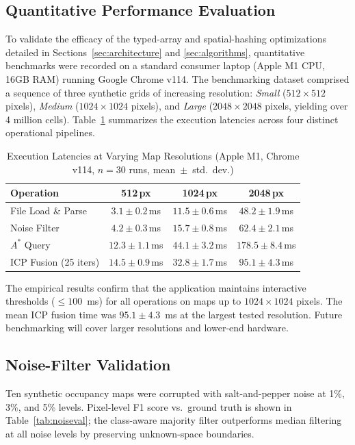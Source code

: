 \documentclass{IEEE_lsens}
\begin{document}
\subsection{Quantitative Performance Evaluation}
To validate the efficacy of the typed-array and spatial-hashing optimizations detailed in Sections~\ref{sec:architecture} and \ref{sec:algorithms}, quantitative benchmarks were recorded on a standard consumer laptop (Apple M1 CPU, 16GB RAM) running Google Chrome v114. The benchmarking dataset comprised a sequence of three synthetic grids of increasing resolution: \emph{Small} ($512 \times 512$ pixels), \emph{Medium} ($1024 \times 1024$ pixels), and \emph{Large} ($2048 \times 2048$ pixels, yielding over 4 million cells). Table~\ref{tab:benchmarks} summarizes the execution latencies across four distinct operational pipelines.

\begin{table}[t]
\centering
\caption{Execution Latencies at Varying Map Resolutions (Apple M1, Chrome v114, $n=30$ runs, mean~$\pm$~std.\ dev.)}
\label{tab:benchmarks}
\scriptsize
\renewcommand{\arraystretch}{1.1}
\begin{tabular}{@{}lccc@{}}
\toprule
\textbf{Operation} & \textbf{512\,px} & \textbf{1024\,px} & \textbf{2048\,px} \\
\midrule
File Load \& Parse & $3.1 \pm 0.2$\,ms & $11.5 \pm 0.6$\,ms & $48.2 \pm 1.9$\,ms \\
Noise Filter & $4.2 \pm 0.3$\,ms & $15.7 \pm 0.8$\,ms & $62.4 \pm 2.1$\,ms \\
$A^{*}$ Query & $12.3 \pm 1.1$\,ms & $44.1 \pm 3.2$\,ms & $178.5 \pm 8.4$\,ms \\
ICP Fusion (25 iters) & $14.5 \pm 0.9$\,ms & $32.8 \pm 1.7$\,ms & $95.1 \pm 4.3$\,ms \\
\bottomrule
\end{tabular}
\vspace{-2mm}
\end{table}

The empirical results confirm that the application maintains interactive thresholds ($\le100$~ms) for all operations on maps up to $1024\times1024$ pixels. The mean ICP fusion time was $95.1\pm4.3$~ms at the largest tested resolution. Future benchmarking will cover larger resolutions and lower-end hardware.

\subsection{Noise-Filter Validation}
Ten synthetic occupancy maps were corrupted with salt-and-pepper noise at 1\%, 3\%, and 5\% levels. Pixel-level F1 score vs.\ ground truth is shown in Table~\ref{tab:noiseval}; the class-aware majority filter outperforms median filtering at all noise levels by preserving unknown-space boundaries.
\end{document}
